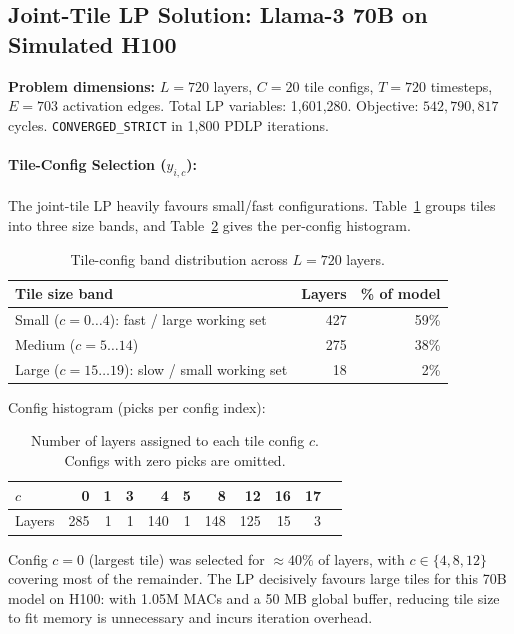 \subsection{Joint-Tile LP Solution: Llama-3 70B on Simulated H100}\label{app:tiling_llama}

\noindent\textbf{Problem dimensions:}
$L = 720$ layers, $C = 20$ tile configs, $T = 720$ timesteps, $E = 703$ activation edges.
Total LP variables: 1{,}601{,}280.
Objective: $542{,}790{,}817$ cycles.
\texttt{CONVERGED\_STRICT} in 1{,}800 PDLP iterations.

\paragraph{Tile-Config Selection ($y_{i,c}$):} The joint-tile LP heavily favours small/fast configurations.
Table~\ref{tab:tile_band} groups tiles into three size bands, and Table~\ref{tab:config_histogram} gives the per-config histogram.

\begin{table}[h]
\centering
\caption{Tile-config band distribution across $L=720$ layers.}
\label{tab:tile_band}
\begin{tabular}{lrr}
\toprule
\textbf{Tile size band} & \textbf{Layers} & \textbf{\% of model} \\
\midrule
Small ($c = 0\ldots4$): fast / large working set  & 427 & 59\% \\
Medium ($c = 5\ldots14$)                            & 275 & 38\% \\
Large ($c = 15\ldots19$): slow / small working set &  18 &  2\% \\
\bottomrule
\end{tabular}
\end{table}

\noindent Config histogram (picks per config index):

\begin{table}[h]
\centering
\caption{Number of layers assigned to each tile config $c$.
Configs with zero picks are omitted.}
\label{tab:config_histogram}
\begin{tabular}{lrrrrrrrrrr}
\toprule
$c$ & 0 & 1 & 3 & 4 & 5 & 8 & 12 & 16 & 17 \\
\midrule
Layers & 285 & 1 & 1 & 140 & 1 & 148 & 125 & 15 & 3 \\
\bottomrule
\end{tabular}
\end{table}

\noindent Config $c=0$ (largest tile) was selected for ${\approx}40\%$
of layers, with $c \in \{4, 8, 12\}$ covering most of the remainder.
The LP decisively favours large tiles for this 70B model on H100: with 1.05M MACs and a 50 MB global buffer, reducing tile size to fit memory is unnecessary and incurs iteration overhead.

